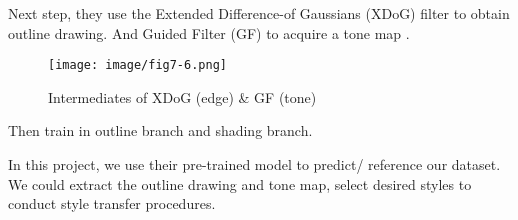 Next step, they use the Extended Difference-of Gaussians (XDoG) filter to obtain outline drawing. And Guided Filter
(GF) to acquire a tone map .
\begin{figure}
  \centering
  \texttt{[image: image/fig7-6.png]}
  \caption{Intermediates of XDoG (edge) \& GF (tone)}
  \label{fig7-6}
\end{figure}
Then train in outline branch and shading branch.

In this project, we use their pre-trained model to predict/ reference our dataset. We could extract the outline drawing and tone map, select desired styles to conduct style transfer procedures.
